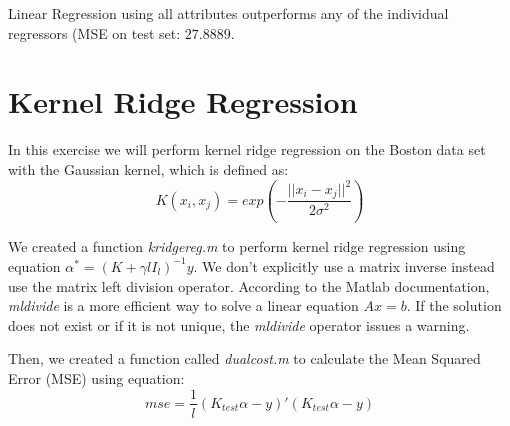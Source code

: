 \documentclass{article} %
\begin{document}
Linear Regression using all attributes outperforms any of the individual regressors (MSE on test set: $27.8889$.



\section{Kernel Ridge Regression}
In this exercise we will perform kernel ridge regression on the Boston data set with the Gaussian kernel, which is defined as:
\begin{equation}
K(x_i,x_j) = exp(-\frac{|| x_i - x_j||^2}{2 \sigma^2})
\end{equation}

We created a function \textit{kridgereg.m} to perform kernel ridge regression using equation $\alpha^* = (K + \gamma l I_l)^{-1}y$. We don't explicitly use a matrix inverse instead use the matrix left division operator. According to the Matlab documentation, \textit{mldivide} is a more efficient way to solve a linear equation $Ax = b$. If the solution does not exist or if it is not unique, the  \textit{mldivide} operator issues a warning.

Then, we created a function called \textit{dualcost.m} to calculate the Mean Squared Error (MSE) using equation:
\begin{equation}
mse = \frac{1}{l}(K_{test} \alpha - y)'(K_{test} \alpha - y)
\end{equation}
\end{document}
